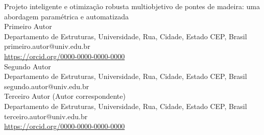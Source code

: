 \begin{center}
{\Huge Projeto inteligente e otimização robusta multiobjetivo de pontes de madeira: uma abordagem paramétrica e automatizada}
\\[5ex]

{\large Primeiro Autor} \\
{\small
Departamento de Estruturas, Universidade, Rua, Cidade, Estado CEP, Brasil \\
primeiro.autor@univ.edu.br \\
\url{https://orcid.org/0000-0000-0000-0000}
} \\[1.2em]

{\large Segundo Autor} \\
{\small
Departamento de Estruturas, Universidade, Rua, Cidade, Estado CEP, Brasil \\
segundo.autor@univ.edu.br
} \\[1.2em]

{\large Terceiro Autor \small(Autor correspondente)} \\
{\small
Departamento de Estruturas, Universidade, Rua, Cidade, Estado CEP, Brasil \\
terceiro.autor@univ.edu.br \\
\url{https://orcid.org/0000-0000-0000-0000}
}
\end{center}
